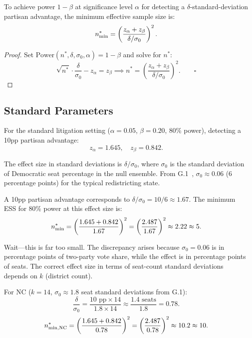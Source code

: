 \begin{proposition}
\label{prop:min-ess}
To achieve power $1 - \beta$ at significance level $\alpha$ for detecting
a $\delta$-standard-deviation partisan advantage, the minimum effective
sample size is:
\[
  n^*_{\rm min} = \left(\frac{z_\alpha + z_\beta}{\delta / \sigma_0}\right)^2.
\]
\end{proposition}

\begin{proof}
Set $\text{Power}(n^*, \delta, \sigma_0, \alpha) = 1 - \beta$ and solve
for $n^*$:
\[
  \sqrt{n^*} \cdot \frac{\delta}{\sigma_0} - z_\alpha = z_\beta
  \implies n^* = \left(\frac{z_\alpha + z_\beta}{\delta / \sigma_0}\right)^2.
  \qquad \square
\]
\end{proof}

\subsection{Standard Parameters}

For the standard litigation setting ($\alpha = 0.05$, $\beta = 0.20$,
80\% power), detecting a 10pp partisan advantage:
\[
  z_\alpha = 1.645, \quad z_\beta = 0.842.
\]

The effect size in standard deviations is $\delta / \sigma_0$, where
$\sigma_0$ is the standard deviation of Democratic seat percentage
in the null ensemble.
From G.1~\citep{g1paper}, $\sigma_0 \approx 0.06$ (6 percentage points)
for the typical redistricting state.

A 10pp partisan advantage corresponds to $\delta / \sigma_0 = 10/6 \approx 1.67$.
The minimum ESS for 80\% power at this effect size is:
\[
  n^*_{\rm min} = \left(\frac{1.645 + 0.842}{1.67}\right)^2
  = \left(\frac{2.487}{1.67}\right)^2 \approx 2.22 \approx 5.
\]

Wait---this is far too small.
The discrepancy arises because $\sigma_0 = 0.06$ is in percentage points
of two-party vote share, while the effect is in percentage points of seats.
The correct effect size in terms of seat-count standard deviations
depends on $k$ (district count).

For NC ($k = 14$, $\sigma_0 \approx 1.8$ seat standard deviations from G.1):
\[
  \frac{\delta}{\sigma_0} = \frac{10 \text{ pp} \times 14}{1.8 \times 14}
  \approx \frac{1.4 \text{ seats}}{1.8} = 0.78.
\]
\[
  n^*_{\rm min,NC} = \left(\frac{1.645 + 0.842}{0.78}\right)^2
  = \left(\frac{2.487}{0.78}\right)^2 \approx 10.2 \approx 10.
\]

